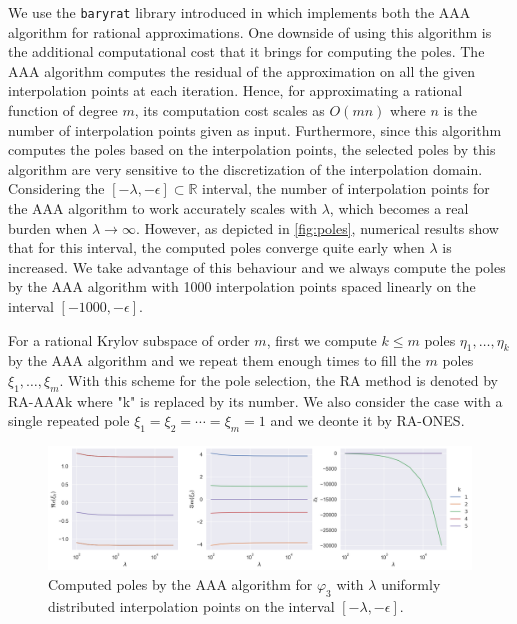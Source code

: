 We use the \texttt{baryrat} library introduced in \cite{hofreither2021BRASIL} which implements both
the AAA algorithm for rational approximations. One downside of using this algorithm
is the additional computational cost that it brings for computing the poles.
The AAA algorithm  computes the residual of the approximation on all the given interpolation points at
each iteration. Hence, for approximating a rational function of degree $m$, its computation cost scales
as $O(mn)$ where $n$ is the number of interpolation points given as input.
Furthermore, since this algorithm computes the poles based on the interpolation points, the
selected poles by this algorithm are very sensitive to the discretization of the interpolation domain.
Considering the $[-\lambda, -\epsilon] \subset \mathbb{R}$ interval, the number of interpolation
points for the AAA algorithm to work accurately scales with $\lambda$, which becomes a real burden
when $\lambda \to \infty$. However, as depicted in \autoref{fig:poles}, numerical results show that
for this interval, the computed poles converge quite early when $\lambda$ is increased. We take
advantage of this behaviour and we always compute the poles by the AAA algorithm with 1000 interpolation
points spaced linearly on the interval $[-1000, -\epsilon]$.

For a rational Krylov subspace of order $m$, first we compute $k \le m$ poles $\eta_1, \dots, \eta_k$
by the AAA algorithm and we repeat them enough times to fill the $m$ poles $\xi_1, \dots, \xi_m$.
With this scheme for the pole selection, the RA method is denoted by RA-AAAk where "k" is replaced
by its number.
We also consider the case with a single repeated pole $\xi_1 = \xi_2 = \cdots = \xi_{m} = 1$ and
we deonte it by RA-ONES.

\begin{figure}[h!]
    \centering
    \includegraphics[width=.9\textwidth]{img/AAA/poles_linspace_aaa.png}
    \caption{
        Computed poles by the AAA algorithm for $\varphi_3$ with $\lambda$ uniformly
        distributed interpolation points on the interval $[-\lambda, -\epsilon]$.
    }
    \label{fig:poles}
\end{figure}


